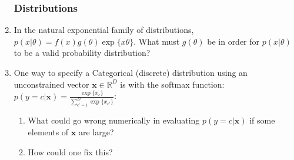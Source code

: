 \documentclass[12pt]{article}
\newcommand{\vx}{{\mathbf{x}}}
\begin{document}
\begin{enumerate}
\subsubsection*{Distributions}
\item In the natural exponential family of distributions, $p(x|\theta) = f(x)g(\theta)\exp\{x\theta\}$.
What must $g(\theta)$ be in order for $p(x | \theta)$ to be a valid probability distribution?\vspace{0.5cm}
\item One way to specify a Categorical (discrete) distribution using an unconstrained vector $\vx \in \mathbb{R}^D$ is with the softmax function: $p(y = c | \vx) = \frac{\exp\{x_c\}}{\sum_{c'=1}^D \exp\{x_{c'}\}}$:
\begin{enumerate}
\item What could go wrong numerically in evaluating $p(y = c | \vx)$ if some elements of $\vx$ are large?\vspace{0.5cm}
\item How could one fix this?
\end{enumerate}
\end{enumerate}
\end{document}
